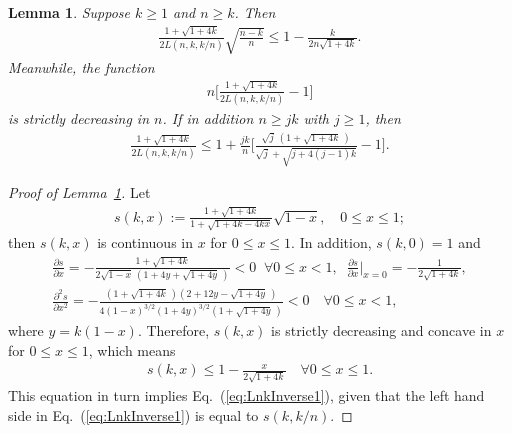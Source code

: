 \documentclass[aop]{imsart}
\theoremstyle{plain}
\newtheorem{lemma}[theorem]{Lemma}
\theoremstyle{remark}
\newcommand{\1}{\operatorname{\uppercase\expandafter{\romannumeral1}}}
\newcommand{\2}{\operatorname{\uppercase\expandafter{\romannumeral2}}}
\newcommand{\3}{\operatorname{\uppercase\expandafter{\romannumeral3}}}
\newcommand{\4}{\operatorname{\uppercase\expandafter{\romannumeral4}}}
\newcommand{\5}{\operatorname{\uppercase\expandafter{\romannumeral5}}}
\newcommand{\6}{\operatorname{\uppercase\expandafter{\romannumeral6}}}
\newcommand{\7}{\operatorname{\uppercase\expandafter{\romannumeral7}}}
\newcommand{\8}{\operatorname{\uppercase\expandafter{\romannumeral8}}}
\newcommand{\9}{\operatorname{\uppercase\expandafter{\romannumeral9}}}
\newcommand{\eref}[1]{Eq.~\textup{(\ref{#1})}}
\newcommand{\lref}[1]{Lemma~\ref{#1}}
\begin{document}
\begin{appendix}
\begin{lemma}\label{lem:LnkInverse}
	Suppose $k\geq 1$ and $n\geq k$. Then
	\begin{align}\label{eq:LnkInverse1}
	\frac{1+\sqrt{1+4k}}{2L(n,k,k/n)}\sqrt{\frac{n-k}{n}}\leq 1-\frac{k}{2n \sqrt{1+4k}}.
	\end{align}
	Meanwhile, the function 
	\begin{align}\label{eq:LnkInverse2}
	n\biggl[\frac{1+\sqrt{1+4k}}{2L(n,k,k/n)}-1\biggr]
	\end{align}
	is strictly decreasing in $n$. If in addition $n\geq jk$ with $j\geq 1$, then
	\begin{align}\label{eq:LnkInverse3}
	\frac{1+\sqrt{1+4k}}{2L(n,k,k/n)}\leq 1+ \frac{jk}{n}\biggl[\frac{\sqrt{j}\,(1+\sqrt{1+4k}\,)}{\sqrt{j}+\sqrt{j+4(j-1)k}}-1\biggr].
	\end{align}
\end{lemma}

\begin{proof}[Proof of \lref{lem:LnkInverse}]
	Let 
	\begin{align}
	s(k,x):=\frac{1+\sqrt{1+4k}}{1+\sqrt{1+4k-4kx}}\sqrt{1-x},\quad 0\leq x\leq 1;
	\end{align}
	then $s(k,x)$ is continuous in $x$ for $0\leq x\leq 1$. In addition, $s(k,0)=1$ and 
	\begin{gather}
	\frac{\partial s}{\partial x}=-\frac{1+\sqrt{1+4k}}{2\sqrt{1-x}\,(1+4y+\sqrt{1+4y}\,)}<0\;\; \forall 0\leq x<1,\;\;
\frac{\partial s}{\partial x}\bigg|_{x=0}=-\frac{1}{2\sqrt{1+4k}},\\[1ex]
\frac{\partial^2 s}{\partial x^2}=-\frac{(1+\sqrt{1+4k}\,)(2+12y-\sqrt{1+4y}\,)}{4(1-x)^{3/2}(1+4y)^{3/2}(1+\sqrt{1+4y}\,)}<0  \quad \forall 0\leq x<1,
\end{gather}
where $y=k(1-x)$.	Therefore, $s(k,x)$ is strictly decreasing and concave in $x$ for $0\leq x\leq 1$, which means
	\begin{align}
	s(k,x)\leq 1-\frac{x}{2\sqrt{1+4k}}\quad \forall 0\leq x\leq 1. 
	\end{align}
	This  equation in turn implies \eref{eq:LnkInverse1}, given that the left hand side in \eref{eq:LnkInverse1} is equal to $s(k,k/n)$.
	
	


\end{proof}
\end{appendix}
\end{document}
